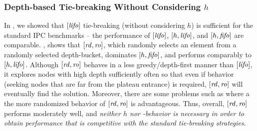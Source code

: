 

\subsubsection{Depth-based Tie-breaking Without Considering $h$}

In , we showed that $[\mbox{\textit{lifo}}]$ tie-breaking (without considering $h$) is
sufficient for the standard IPC benchmarks -- the performance of $[\mbox{\textit{lifo}}]$, $[h,\mbox{\textit{lifo}}]$, and $[h,\mbox{\textit{fifo}}]$ are comparable.
, shows that $[\mbox{\textit{rd}},\mbox{\textit{ro}}]$, which randomly selects an element from a randomly selected depth-bucket, dominates $[h,\mbox{\textit{fifo}}]$,
and performs comparably to $[h,\mbox{\textit{lifo}}]$.
Although $[\mbox{\textit{rd}},\mbox{\textit{ro}}]$ behaves in a less greedy/depth-first manner than $[\mbox{\textit{lifo}}]$, 
it explores nodes with high depth sufficiently often so that even if \lifo behavior (seeking nodes that are far from the plateau entrance) is required, $[\mbox{\textit{rd}},\mbox{\textit{ro}}]$ will eventually find the solution.
Moreover, there are some problems such as  where a the more randomized behavior of $[\mbox{\textit{rd}},\mbox{\textit{ro}}]$ is advantageous.
Thus, overall, $[\mbox{\textit{rd}},\mbox{\textit{ro}}]$ performs moderately well, and 
\emph{neither $h$ nor \lifo-behavior is necessary in order to obtain performance that is competitive with the standard
tie-breaking strategies}.



